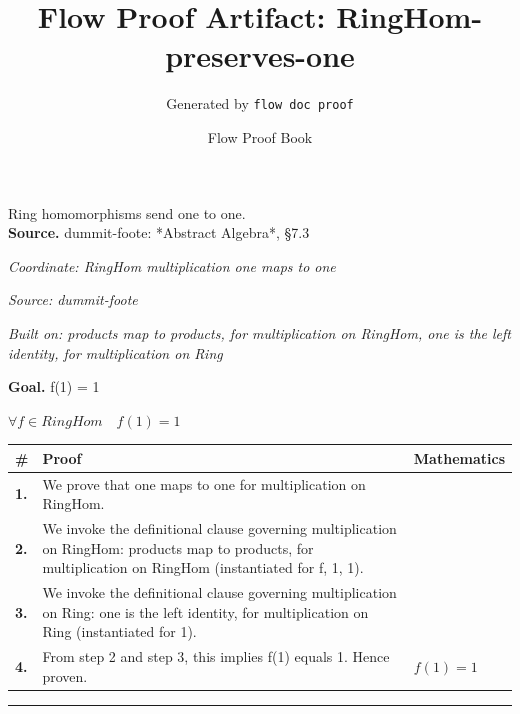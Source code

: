 \documentclass[11pt]{article}
\title{Flow Proof Artifact: RingHom-preserves-one}
\author{Generated by \texttt{flow doc proof}}
\date{Flow Proof Book}
\theoremstyle{definition}
\begin{document}
\maketitle
Ring homomorphisms send one to one.\\[0.5em]
\textbf{Source.} dummit-foote: *Abstract Algebra*, §7.3\\[0.5em]
\bigskip
{}\par
\smallskip\noindent\textit{Coordinate: RingHom \cdot multiplication \cdot one maps to one}\par
\smallskip\noindent\textit{Source: dummit-foote}\par
\smallskip\noindent\textit{Built on: products map to products, for multiplication on RingHom, one is the left identity, for multiplication on Ring}\par
\medskip
\noindent\textbf{Goal.} f(1) = 1\par
\noindent$\displaystyle \forall f \in RingHom\quad f(1) = 1$\par
\medskip
\noindent
\begin{tabular}{@{} >{\raggedright\arraybackslash}p{} >{\raggedright\arraybackslash}p{} >{\raggedleft\arraybackslash}p{} @{}}
\textbf{\#} & \textbf{Proof} & \textbf{Mathematics} \\
\midrule
\textbf{1.} & We prove that one maps to one for multiplication on RingHom. & \\[0.45em]
\textbf{2.} & We invoke the definitional clause governing multiplication on RingHom: products map to products, for multiplication on RingHom (instantiated for f, 1, 1). & \\[0.45em]
\textbf{3.} & We invoke the definitional clause governing multiplication on Ring: one is the left identity, for multiplication on Ring (instantiated for 1). & \\[0.45em]
\textbf{4.} & From step 2 and step 3, this implies f(1) equals 1. Hence proven. & $\displaystyle f(1) = 1$ \\[0.45em]
\bottomrule
\end{tabular}
\label{thm:RingHom-multiplication-one_maps_to_one}
\par\medskip\hrule
\end{document}
